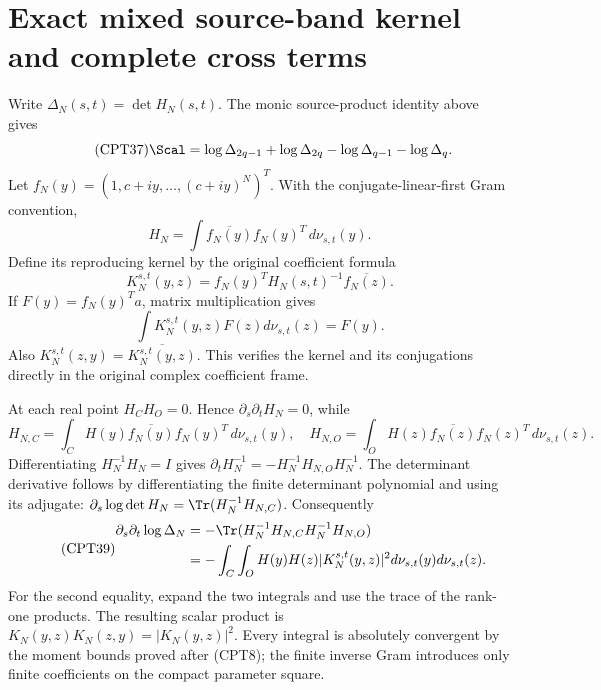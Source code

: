 \documentclass[11pt,a4paper]{article}
\begin{document}
\section{Exact mixed source-band kernel and complete cross terms}

Write \(\Delta_N(s,t)=\det H_N(s,t)\).
The monic source-product identity above gives
\begin{equation}\tag{CPT37}
 \Scal=
 \log\Delta_{2q-1}+\log\Delta_{2q}
          -\log\Delta_{q-1}-\log\Delta_q.
\end{equation}
Let \(f_N(y)=(1,c+iy,\ldots,(c+iy)^N)^T\).
With the conjugate-linear-first Gram convention,
\[
 H_N=\int\overline{f_N(y)}f_N(y)^T\,d\nu_{s,t}(y).
\]
Define its reproducing kernel by the original coefficient formula
\begin{equation}\tag{CPT38}
 K_N^{s,t}(y,z)
   =f_N(y)^T H_N(s,t)^{-1}\overline{f_N(z)}.
\end{equation}
If \(F(y)=f_N(y)^Ta\), matrix multiplication gives
\[
 \int K_N^{s,t}(y,z)F(z)d\nu_{s,t}(z)=F(y).
\]
Also \(K_N^{s,t}(z,y)=\overline{K_N^{s,t}(y,z)}\).
This verifies the kernel and its conjugations directly in the
original complex coefficient frame.

At each real point \(H_CH_O=0\).  Hence
\(\partial_s\partial_tH_N=0\), while
\[
 H_{N,C}=\int_C H(y)\overline{f_N(y)}f_N(y)^T\,d\nu_{s,t}(y),
 \quad
 H_{N,O}=\int_O H(z)\overline{f_N(z)}f_N(z)^T\,d\nu_{s,t}(z).
\]
Differentiating \(H_N^{-1}H_N=I\) gives
\(\partial_tH_N^{-1}=-H_N^{-1}H_{N,O}H_N^{-1}\).
The determinant derivative follows by differentiating the
finite determinant polynomial and using its adjugate:
\(\partial_s\log\det H_N=\Tr(H_N^{-1}H_{N,C})\).
Consequently
\begin{equation}\tag{CPT39}
\begin{split}
 \partial_s\partial_t\log\Delta_N
 &=-\Tr(H_N^{-1}H_{N,C}H_N^{-1}H_{N,O})\\
 &=-\int_C\int_O H(y)H(z)|K_N^{s,t}(y,z)|^2
                          d\nu_{s,t}(y)d\nu_{s,t}(z).
\end{split}
\end{equation}
For the second equality, expand the two integrals and use the
trace of the rank-one products.  The resulting scalar product
is \(K_N(y,z)K_N(z,y)=|K_N(y,z)|^2\).
Every integral is absolutely convergent by the moment bounds
proved after (CPT8); the finite inverse Gram introduces only
finite coefficients on the compact parameter square.
\end{document}
